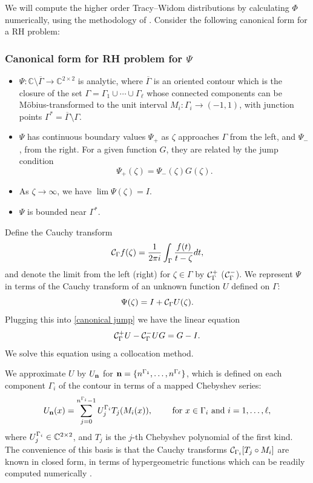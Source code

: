 \documentclass[11pt,fleqn]{article}
\numberwithin{equation}{section}
\begin{document}
    We will compute the higher order Tracy--Widom distributions by calculating $\Phi$ numerically, using the methodology of \cite{SOPainleveII,SORHFramework}.   Consider the following canonical form for a RH  problem:


\subsubsection*{Canonical form for RH problem for $\Psi$}

\begin{itemize}
    \item[(a)] $\Psi: \mathbb C\setminus \overline\Gamma\to \mathbb C^{2\times 2}$ is analytic, where $\overline\Gamma$ is an oriented contour which is
    the closure
    of the set $\Gamma = \Gamma_1 \cup \cdots \cup \Gamma_\ell$ whose connected components can be M\"obius-transformed
    to the unit interval $M_i : \Gamma_i \rightarrow (-1,1)$, with junction points $\Gamma^*=\overline\Gamma\setminus\Gamma$.
    \item[(b)] $\Psi$ has continuous boundary values $\Psi_+$ as $\zeta$ approaches
$\Gamma$ from the left, and $\Psi_-$, from the
right.  For a given function $G$, they
are related by the jump condition
    \begin{equation}\label{canonical jump}
        \Psi_+(\zeta)=\Psi_-(\zeta) G(\zeta).
        \end{equation}
    \item[(c)] As $\zeta\to\infty$, we have $\lim\Psi(\zeta)=I$.
    \item[(d)] $\Psi$ is bounded near $\Gamma^*$.
\end{itemize}



Define the Cauchy transform
%
    $${\cal C}_{\Gamma} f(\zeta) = {1 \over 2 \pi i} \int_\Gamma {f(t) \over t - \zeta} dt,$$
%
and denote the limit from the left  (right) for $\zeta \in \Gamma$ by ${\cal C}_\Gamma^+$ (${\cal C}_\Gamma^-$).  We represent $\Psi$ in terms of the Cauchy transform of an unknown function $U$ defined on $\Gamma$:
%
    $$\Psi(\zeta) = I + {\cal C}_\Gamma U(\zeta).$$
%
Plugging this into \eqref{canonical jump} we have the linear equation
%
    \begin{equation}\label{SIE}{\cal C}_\Gamma^+ U - {\cal C}_\Gamma^- U G = G - I.\end{equation}
%
We solve this equation using a collocation method.

We approximate $U$ by $U_{\bf n}$ for ${\bf n} =   \{n^{\Gamma_1},\dots,n^{\Gamma_\ell}\}$, which is defined  on each component $\Gamma_i$ of the contour in terms of a mapped Chebyshev series:
    $$U_{\bf n}(x) =  \sum_{j = 0}^{n^{\Gamma_i} - 1} U_j^{\Gamma_i} T_j(M_i(x)),\qquad \hbox{ for } x \in \Gamma_i \hbox{ and } i = 1,\ldots,\ell,$$
where $U_j^{\Gamma_i} \in {\Bbb C}^{2 \times 2}$, and $T_j$ is the $j$-th Chebyshev polynomial of the first kind.  The convenience of this basis is that the Cauchy transforms ${\cal C}_{\Gamma_i}[T_j \circ M_i]$ are known in closed form, in terms of hypergeometric functions which can be readily computed numerically \cite{SOHilbertTransform}.
\end{document}
